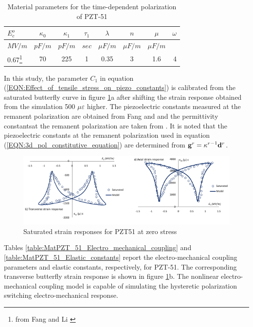 \begin{table}   
\caption{Material parameters for the time-dependent polarization of PZT-51}
\centering
\begin{tabular}{l c c c c c c r}
\hline 
$E_c^o$ & $\kappa_0$ & $\kappa_1$ & $\tau_1$ & $\lambda$ & $ n $ & $\mu$&  $\omega$ \\ \hline
$MV/m$ & $pF/m$ & $pF/m$ &  $sec$ & $\mu F/m$ & $\mu F/m $& $\mu F/m $\\ \hline 
0.67\footnote{from Fang and Li \cite{raey}}&70&225&1&0.35&3&1.6&4\\ \hline
\end{tabular}
\label{table:MatPZT_51}
\end{table}

In this study, the parameter $C_1$ in equation
(\ref{EQN:Effect_of_tensile_stress_on_piezo_constants}) is calibrated from the saturated butterfly curve in figure \ref{saturated_strain_responses_pzt51_zero_stress}a after shifting the strain response obtained from the simulation 500 $\mu \varepsilon$ higher.
The piezoelectric constants measured at the remanent polarization are obtained
from Fang and \cite{Li2004959} and the permittivity constantsat the remanent polarization are taken from \cite{Muliana2011}.
It is noted that the piezoelectric constants at the remanent polarization used in equation (\ref{EQN:3d_pol_constitutive_equation}) are determined from ${{\bf{g}}^r} = {{\mathbf{\kappa }}^r}^{ - 1}{{\bf{d}}^r}$. 
\begin{figure} 
\centering
\includegraphics[width=6.0in]{./chap_2_pol_sw/figures/saturated_strain_responses_pzt51_zero_stress.pdf} 
\caption{Saturated strain responses for PZT51 at zero stress}
\label{saturated_strain_responses_pzt51_zero_stress}
\end{figure}
Tables \ref{table:MatPZT_51_Electro_mechanical_coupling} and \ref{table:MatPZT_51_Elastic_constants} report the electro-mechanical coupling parameters and elastic constants, respectively, for PZT-51. 
The corresponding transverse butterfly strain response is shown in figure \ref{saturated_strain_responses_pzt51_zero_stress}b. 
The nonlinear electro-mechanical coupling model is capable of simulating the hysteretic polarization switching electro-mechanical response.


